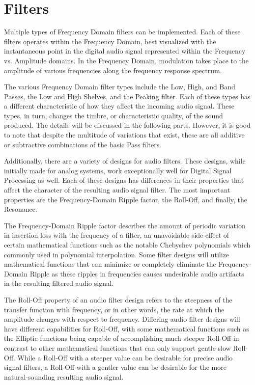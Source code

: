 \documentclass[a4paper,12pt]{report}
\begin{document}
\section{Filters}
\label{sec:filters}
Multiple types of Frequency Domain filters can be implemented. Each of these filters operates within the Frequency Domain, best visualized with the instantaneous point in the digital audio signal represented within the Frequency vs. Amplitude domains. In the Frequency Domain, modulation takes place to the amplitude of various frequencies along the frequency response spectrum. 

The various Frequency Domain filter types include the Low, High, and Band Passes, the Low and High Shelves, and the Peaking filter. Each of these types has a different characteristic of how they affect the incoming audio signal. These types, in turn, changes the timbre, or characteristic quality, of the sound produced. The details will be discussed in the following parts. However, it is good to note that despite the multitude of variations that exist, these are all additive or subtractive combinations of the basic Pass filters.

Additionally, there are a variety of designs for audio filters. These designs, while initially made for analog systems, work exceptionally well for Digital Signal Processing as well. Each of these designs has differences in their properties that affect the character of the resulting audio signal filter. The most important properties are the Frequency-Domain Ripple factor, the Roll-Off, and finally, the Resonance.

The Frequency-Domain Ripple factor describes the amount of periodic variation in insertion loss with the frequency of a filter, an unavoidable side-effect of certain mathematical functions such as the notable Chebyshev polynomials which commonly used in polynomial interpolation. Some filter designs will utilize mathematical functions that can minimize or completely eliminate the Frequency-Domain Ripple as these ripples in frequencies causes undesirable audio artifacts in the resulting filtered audio signal.

The Roll-Off property of an audio filter design refers to the steepness of the transfer function with frequency, or in other words, the rate at which the amplitude changes with respect to frequency.  Differing audio filter designs will have different capabilities for Roll-Off, with some mathematical functions such as the Elliptic functions being capable of accomplishing much steeper Roll-Off in contrast to other mathematical functions that can only support gentle slow Roll-Off. While a Roll-Off with a steeper value can be desirable for precise audio signal filters, a Roll-Off with a gentler value can be desirable for the more natural-sounding resulting audio signal.
\end{document}
